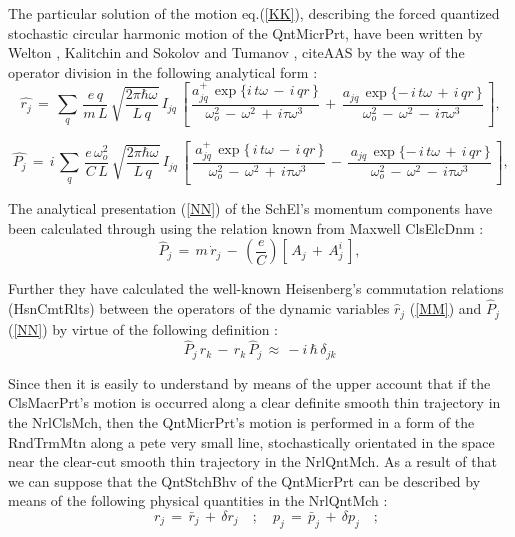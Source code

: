 \documentclass[12pt]{article}
\begin{document}
 The particular solution of the motion eq.(\ref{KK}), describing the forced
quantized stochastic circular harmonic motion of the QntMicrPrt, have been
written by Welton \cite{ThW}, Kalitchin \cite{NK} and Sokolov and Tumanov
\cite{ASBT}, cite{AAS} by the way of the operator division in the following
analytical form :
\begin{equation}\label{MM}
\,\hat{r_j}\,=\,\sum_q\,\frac{e\,q}{m\,L}\,
\sqrt{\frac{2\pi \hbar\omega }{\,L\,q\,}}\,I_{jq}\,
\left[\,\frac{a_{jq}^{+}\,\exp{\{i\,t\omega \,-\,i\,qr\,\}}}
{\omega _o^2\,-\,\omega ^2\,+ \,i\tau \omega ^3\,}\,+
\,\frac{a_{jq}\,\exp{\{-\,i\,t\omega \,+\,i\,qr\,\}}}
{\omega _o^2\,-\,\omega ^2\,-\,i\tau \omega ^3\,}\,\right],
\end{equation}

\begin{equation}\label{NN}
\,\hat{P_j}\,=\,i\,\sum_q\,\frac{e\,\omega _o^2}{C\,L}\,
\sqrt{\frac{2\pi\hbar\omega }{\,L\,q\,}}\,I_{jq}\,
\left[\,\frac{\,a_{jq}^{+}\,\exp{\{\,i\,t\omega \,-\,i\,qr\,\}}}
{\omega _o^2\,-\,\omega ^2\,+\,i\tau \omega ^3\,}\,-
\,\frac{\,a_{jq}\,\exp{\{-\,i\,t\omega \,+\,i\,qr\,\}}}
{\omega _o^2\,-\,\omega ^2\,-\,i\tau \omega ^3}\,\right],
\end{equation}

 The analytical presentation (\ref{NN}) of the SchEl's momentum components
have been calculated through using the relation known from Maxwell ClsElcDnm :
\begin{equation}\label{OO}
\hat{P}_j\,=\,m\,\dot{r}_j\,-\,(\frac{e}{C})\left[\,A_j\,+\,A_j^i\,\right],
\end{equation}

 Further they have calculated the well-known Heisenberg's  commutation
relations (HsnCmtRlts) between the operators of the dynamic variables
$\hat{r}_j$ (\ref{MM}) and $\hat{P}_j$ (\ref{NN}) by virtue of the following
definition :
\begin{equation}\label{PP}
{\hat P}_j\,{\hat r}_k\,-\,{\hat r}_k\,{\hat P}_j\,\approx
\,-i\,\hbar\,\delta_{jk}
\end{equation}

 Since then it is easily to understand by means of the upper account that
if the ClsMacrPrt's motion is occurred along a clear definite smooth thin
trajectory in the NrlClsMch, then the QntMicrPrt's motion is performed in
a form of the RndTrmMtn along a pete very small line, stochastically
orientated in the space near the clear-cut smooth thin trajectory in the
NrlQntMch. As a result of that we can suppose that the QntStchBhv of the
QntMicrPrt can be described by means of the following physical quantities
in the NrlQntMch :
\begin{equation}\label{QQ}
\quad r_j\,=\,{\bar r}_j\,+\,\delta{r}_j\quad;
\quad p_j\,=\,\bar{p}_j\,+\,\delta{p}_j\quad;
\end{equation}
\end{document}
